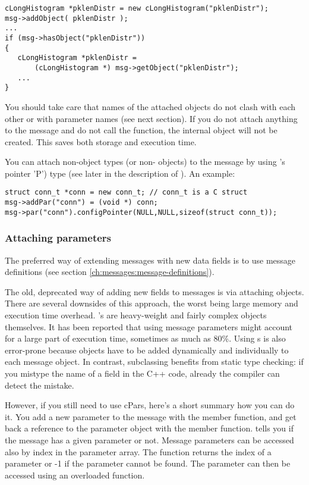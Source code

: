 \begin{verbatim}
cLongHistogram *pklenDistr = new cLongHistogram("pklenDistr");
msg->addObject( pklenDistr );
...
if (msg->hasObject("pklenDistr"))
{
   cLongHistogram *pklenDistr =
       (cLongHistogram *) msg->getObject("pklenDistr");
   ...
}
\end{verbatim}

You should take care that names of the attached objects do not
clash with each other or with  parameter names
(see next section).
If you do not attach anything to the message and do not call the
 function, the internal  object
will not be created.
This saves both storage and execution time.

You can attach non-object types (or non- objects) to
the message by using
's  pointer 'P') type (see later in the description
of ). An example:

\begin{verbatim}
struct conn_t *conn = new conn_t; // conn_t is a C struct
msg->addPar("conn") = (void *) conn;
msg->par("conn").configPointer(NULL,NULL,sizeof(struct conn_t));
\end{verbatim}




\subsubsection{Attaching parameters}

The preferred way of extending messages with new data fields is to use
message definitions (see section \ref{ch:messages:message-definitions}).

The old, deprecated way of adding new fields to messages is via
attaching  objects.
There are several downsides of this approach, the worst being
large memory and execution time overhead. 's are
heavy-weight and fairly complex objects themselves.
It has been reported that using  message parameters
might account for a large part of execution time, sometimes as much as 80\%.
Using s is also error-prone because  objects
have to be added dynamically and individually to each message object.
In contrast, subclassing benefits from static type checking:
if you mistype the name of a field in the C++ code, already the compiler
can detect the mistake.


However, if you still need to use cPars, here's a short summary
how you can do it. You add a new parameter to the message with the
 member function, and get back a reference
to the parameter object with the  member function.
 tells you if the message has a
given parameter or not.
Message parameters can be accessed also by index in the parameter
array. The  function returns the index of a parameter
or -1 if the parameter cannot be found. The parameter can then be
accessed using an overloaded  function.

